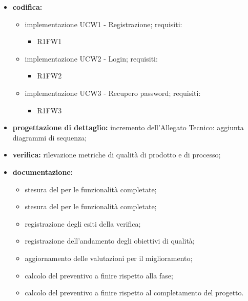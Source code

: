 \begin{itemize}
	\item \textbf{codifica:} 
			\begin{itemize}
				\item implementazione UCW1 - Registrazione; requisiti:
					\begin{itemize}
						\item R1FW1
					\end{itemize}
				\item implementazione UCW2 - Login; requisiti:
					\begin{itemize}
						\item R1FW2
					\end{itemize}
				\item implementazione UCW3 - Recupero password; requisiti:
					\begin{itemize}
						\item R1FW3
					\end{itemize}
			\end{itemize}
	\item \textbf{progettazione di dettaglio:} incremento dell’Allegato Tecnico: aggiunta diagrammi di sequenza;
 	\item \textbf{verifica:} rilevazione metriche di qualità di prodotto e di processo;
	\item \textbf{documentazione:} 
	 \begin{itemize}
		\item stesura del \MU{} per le funzionalità completate;
		\item stesura del \MS{} per le funzionalità completate;
  		\item registrazione degli esiti della verifica;
     	\item registrazione dell’andamento degli obiettivi di qualità;
		\item aggiornamento delle valutazioni per il miglioramento; 
		\item calcolo del preventivo a finire rispetto alla fase;
		\item calcolo del preventivo a finire rispetto al completamento del progetto.
	 \end{itemize}
\end{itemize}

\pagebreak

